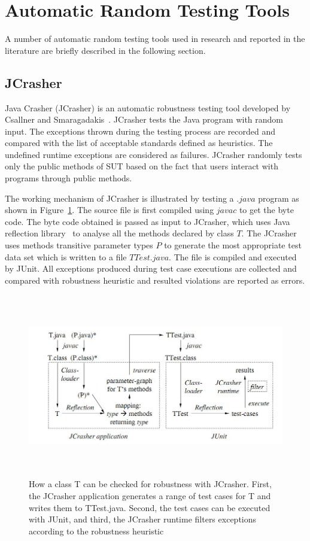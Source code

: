 \section{Automatic Random Testing Tools}
A number of automatic random testing tools used in research and reported in the literature are briefly described in the following section.


\subsection{JCrasher}
Java Crasher (JCrasher) is an automatic robustness testing tool developed by Csallner and Smaragadakis~\cite{csallner2004jcrasher}. JCrasher tests the Java program with random input. The exceptions thrown during the testing process are recorded and compared with the list of acceptable standards defined as heuristics. The undefined runtime exceptions are considered as failures. JCrasher randomly tests only the public methods of SUT based on the fact that users interact with programs through public methods.

The working mechanism of JCrasher is illustrated by testing a $.java$ program as shown in Figure~\ref{fig:JCrasher}. The source file is first compiled using $javac$ to get the byte code. The byte code obtained is passed as input to JCrasher, which uses Java reflection library~\cite{chan1999java} to analyse all the methods declared by class $T$. The JCrasher uses methods transitive parameter types $P$ to generate the most appropriate test data set which is written to a file $TTest.java$. The file is compiled and executed by JUnit. All exceptions produced during test case executions are collected and compared with robustness heuristic and resulted violations are reported as errors.
\bigskip
\bigskip
\begin{figure}[h]
	\centering
	\includegraphics[width=15cm, height=8cm]{chapter2/JCrasher.png}
	\bigskip
	\caption{How a class T can be checked for robustness with JCrasher. First, the JCrasher application generates a range of test cases for T and writes them to TTest.java. Second, the test cases can be executed with JUnit, and third, the JCrasher runtime filters exceptions according to the robustness heuristic~\cite{csallner2004jcrasher}}
	\label{fig:JCrasher}
\end{figure}
\bigskip

